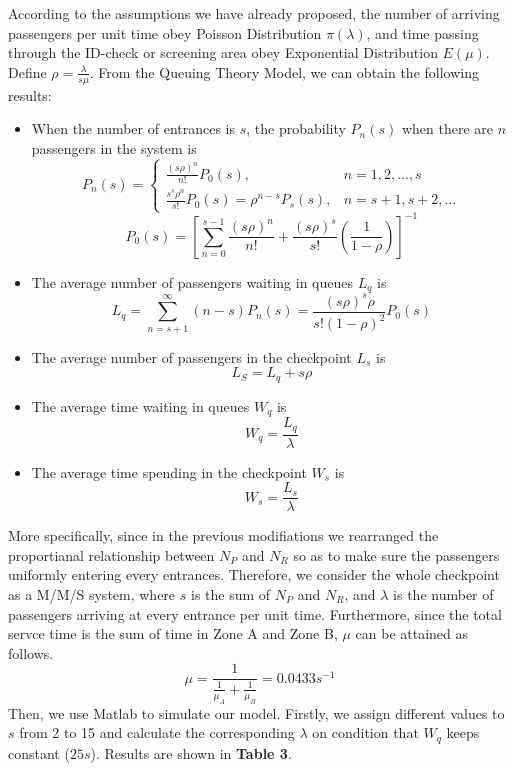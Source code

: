 \documentclass{mcmthesis}
\begin{document}
According to the assumptions we have already proposed, the number of arriving passengers per unit time obey Poisson Distribution $\pi(\lambda)$, and time passing through the ID-check or screening area obey Exponential Distribution $E(\mu)$. Define $\rho=\frac{\lambda}{s\mu}$. From the Queuing Theory Model, we can obtain the following results:

\begin{itemize}
\item When the number of entrances is $s$, the probability $P_n(s)$ when there are $n$ passengers in the system  is
\begin{equation}
    P_n(s)=
   \begin{cases}
   \frac{(s\rho)^n}{n!}P_0(s), &\mbox{$n=1,2,\ldots,s$}\\
   \frac{s^s\rho^n}{s!}P_0(s)=\rho^{n-s}P_s(s), &\mbox{$n=s+1,s+2,\ldots$}
   \end{cases}
\end{equation}
$$P_0(s)=[\sum_{n=0}^{s-1}\frac{(s\rho)^n}{n!}+\frac{(s\rho)^s}{s!}(\frac{1}{1-\rho})]^{-1}$$
\item The average number of passengers waiting in queues $L_q$ is
$$L_q=\sum_{n=s+1}^{\infty}(n-s)P_n(s)=\frac{(s\rho)^s\rho}{s!(1-\rho)^2}P_0(s)$$
\item The average number of passengers in the checkpoint $L_s$ is 
$$L_S=L_q+s\rho$$
\item The average time waiting in queues $W_q$ is
$$W_q=\frac{L_q}{\lambda}$$
\item The average time spending in the checkpoint $W_s$ is
$$W_s=\frac{L_s}{\lambda}$$
\end{itemize}

More specifically, since in the previous modifiations we rearranged the proportianal relationship between $N_P$ and $N_R$ so as to make sure the passengers uniformly entering every entrances. Therefore, we consider the whole checkpoint as a M/M/S system, where $s$ is the sum of $N_P$ and $N_R$, and $\lambda$ is the number of passengers  arriving at every entrance per unit time. Furthermore, since the total servce time is the sum of time in Zone A and Zone B, $\mu$ can be attained as follows.
$$\mu=\frac{1}{\frac{1}{\mu_A}+\frac{1}{\mu_B}}=0.0433s^{-1}$$
Then, we use Matlab to simulate our model. Firstly, we assign different values to $s$ from 2 to 15 and calculate the corresponding $\lambda$ on condition that $W_q$ keeps constant ($25s$). Results are shown in \textbf{Table 3}.
\end{document}
